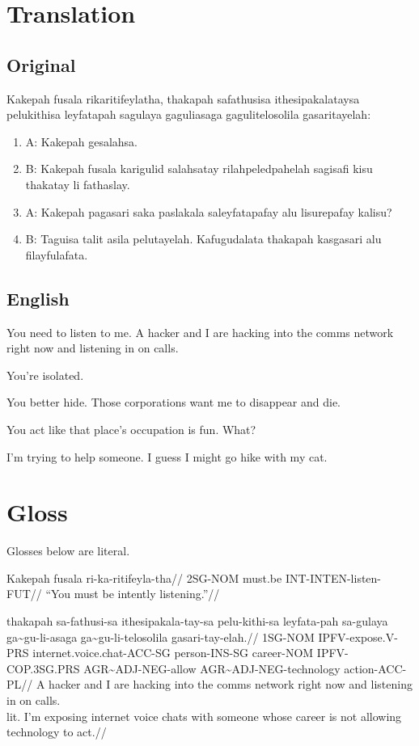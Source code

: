 \documentclass{thiguka}
\begin{document}
\section{Translation}

\subsection{Original}
Kakepah fusala rikaritifeylatha, thakapah safathusisa ithesipakalataysa pelukithisa leyfatapah sagulaya gaguliasaga gagulitelosolila gasaritayelah:

\begin{enumerate}
\item A: Kakepah gesalahsa.
\item B: Kakepah fusala karigulid salahsatay rilahpeledpahelah sagisafi kisu thakatay li fathaslay.
\item A: Kakepah pagasari saka paslakala saleyfatapafay alu lisurepafay kalisu?
\item B: Taguisa talit asila pelutayelah. Kafugudalata thakapah kasgasari alu filayfulafata.
\end{enumerate}

\subsection{English}
You need to listen to me. A hacker and I are hacking into the comms network right now and listening in on calls.

You're isolated.

You better hide. Those corporations want me to disappear and die.

You act like that place's occupation is fun. What?

I'm trying to help someone. I guess I might go hike with my cat.

\section{Gloss}
Glosses below are literal.

\ex
\begingl
\gla  Kakepah fusala ri-ka-ritifeyla-tha//
\glb  2SG-NOM must.be INT-INTEN-listen-FUT//
\glft ``You must be intently listening.''//
\endgl
\xe

\ex
\begingl
\gla thakapah sa-fathusi-sa ithesipakala-tay-sa pelu-kithi-sa leyfata-pah sa-gulaya ga\~{}gu-li-asaga ga\~{}gu-li-telosolila gasari-tay-elah.//
\glb 1SG-NOM IPFV-expose.V-PRS internet.voice.chat-ACC-SG person-INS-SG career-NOM IPFV-COP.3SG.PRS AGR\~{}ADJ-NEG-allow AGR\~{}ADJ-NEG-technology action-ACC-PL//
\glft A hacker and I are hacking into the comms network right now and listening in on calls.\\
      lit. I'm exposing internet voice chats with someone whose career is not allowing technology to act.//
\endgl
\xe
\end{document}
